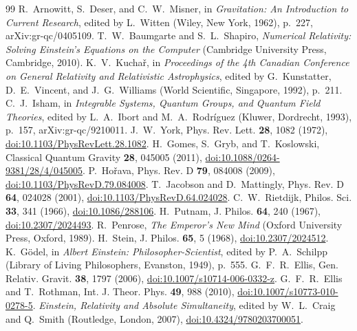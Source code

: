 \documentclass[aps,prd,reprint,amsmath,amssymb,superscriptaddress]{revtex4-2}
\begin{document}
\begin{thebibliography}{99}
 R.~Arnowitt, S.~Deser, and C.~W.~Misner, in \textit{Gravitation: An Introduction to Current Research}, edited by L.~Witten (Wiley, New York, 1962), p.~227, arXiv:gr-qc/0405109.
 T.~W.~Baumgarte and S.~L.~Shapiro, \textit{Numerical Relativity: Solving Einstein's Equations on the Computer} (Cambridge University Press, Cambridge, 2010).
 K.~V.~Kucha{\v r}, in \textit{Proceedings of the 4th Canadian Conference on General Relativity and Relativistic Astrophysics}, edited by G.~Kunstatter, D.~E.~Vincent, and J.~G.~Williams (World Scientific, Singapore, 1992), p.~211.
 C.~J.~Isham, in \textit{Integrable Systems, Quantum Groups, and Quantum Field Theories}, edited by L.~A.~Ibort and M.~A.~Rodr\'iguez (Kluwer, Dordrecht, 1993), p.~157, arXiv:gr-qc/9210011.
 J.~W.~York, Phys. Rev. Lett. \textbf{28}, 1082 (1972), \href{https://doi.org/10.1103/PhysRevLett.28.1082}{doi:10.1103/PhysRevLett.28.1082}.
 H.~Gomes, S.~Gryb, and T.~Koslowski, Classical Quantum Gravity \textbf{28}, 045005 (2011), \href{https://doi.org/10.1088/0264-9381/28/4/045005}{doi:10.1088/0264-9381/28/4/045005}.
 P.~Ho{\v r}ava, Phys. Rev. D \textbf{79}, 084008 (2009), \href{https://doi.org/10.1103/PhysRevD.79.084008}{doi:10.1103/PhysRevD.79.084008}.
 T.~Jacobson and D.~Mattingly, Phys. Rev. D \textbf{64}, 024028 (2001), \href{https://doi.org/10.1103/PhysRevD.64.024028}{doi:10.1103/PhysRevD.64.024028}.
 C.~W.~Rietdijk, Philos. Sci. \textbf{33}, 341 (1966), \href{https://doi.org/10.1086/288106}{doi:10.1086/288106}.
 H.~Putnam, J. Philos. \textbf{64}, 240 (1967), \href{https://doi.org/10.2307/2024493}{doi:10.2307/2024493}.
 R.~Penrose, \textit{The Emperor's New Mind} (Oxford University Press, Oxford, 1989).
 H.~Stein, J. Philos. \textbf{65}, 5 (1968), \href{https://doi.org/10.2307/2024512}{doi:10.2307/2024512}.
 K.~G{\"o}del, in \textit{Albert Einstein: Philosopher-Scientist}, edited by P.~A.~Schilpp (Library of Living Philosophers, Evanston, 1949), p.~555.
 G.~F.~R.~Ellis, Gen. Relativ. Gravit. \textbf{38}, 1797 (2006), \href{https://doi.org/10.1007/s10714-006-0332-z}{doi:10.1007/s10714-006-0332-z}.
 G.~F.~R.~Ellis and T.~Rothman, Int. J. Theor. Phys. \textbf{49}, 988 (2010), \href{https://doi.org/10.1007/s10773-010-0278-5}{doi:10.1007/s10773-010-0278-5}.
 \textit{Einstein, Relativity and Absolute Simultaneity}, edited by W.~L.~Craig and Q.~Smith (Routledge, London, 2007), \href{https://doi.org/10.4324/9780203700051}{doi:10.4324/9780203700051}.

\end{thebibliography}
\end{document}
